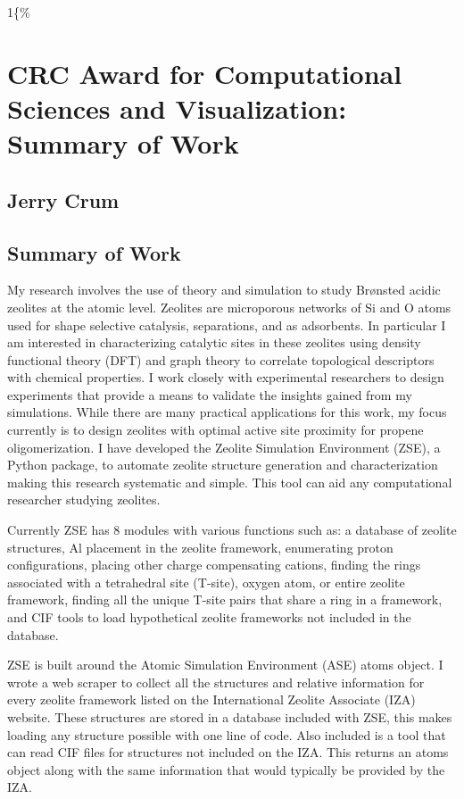 \documentclass[11pt]{article}
\author{Jerry Crum}
\date{}
\title{}
\begin{document}
\begin{OPTIONS}
\def\udesoftecoverride\#1\mainmatter\{\%
  \AfterEndPreamble{#1\mainmatter}
\end{OPTIONS}

\section*{CRC Award for Computational Sciences and Visualization: Summary of Work}
\label{sec:orgb25748d}

\subsection*{Jerry Crum}
\label{sec:org6fc7f14}

\subsection*{Summary of Work}
\label{sec:org3b7bc89}

My research involves the use of theory and simulation to study Br\o nsted acidic zeolites at the atomic level. Zeolites are microporous networks of Si and O atoms used for shape selective catalysis, separations, and as adsorbents. In particular I am interested in characterizing catalytic sites in these zeolites using density functional theory (DFT) and graph theory to correlate topological descriptors with chemical properties. I work closely with experimental researchers to design experiments that provide a means to validate the insights gained from my simulations. While there are many practical applications for this work, my focus currently is to design zeolites with optimal active site proximity for propene oligomerization. I have developed the Zeolite Simulation Environment (ZSE), a Python package, to automate zeolite structure generation and characterization making this research systematic and simple. This tool can aid any computational researcher studying zeolites. 

Currently ZSE has 8 modules with various functions such as: a database of zeolite structures, Al placement in the zeolite framework, enumerating proton configurations, placing other charge compensating cations, finding the rings associated with a tetrahedral site (T-site), oxygen atom, or entire zeolite framework, finding all the unique T-site pairs that share a ring in a framework, and CIF tools to load hypothetical zeolite frameworks not included in the database. 

ZSE is built around the Atomic Simulation Environment (ASE) atoms object. I wrote a web scraper to collect all the structures and relative information for every zeolite framework listed on the International Zeolite Associate (IZA) website. These structures are stored in a database included with ZSE, this makes loading any structure possible with one line of code. Also included is a tool that can read CIF files for structures not included on the IZA. This returns an atoms object along with the same information that would typically be provided by the IZA. 
\end{document}
